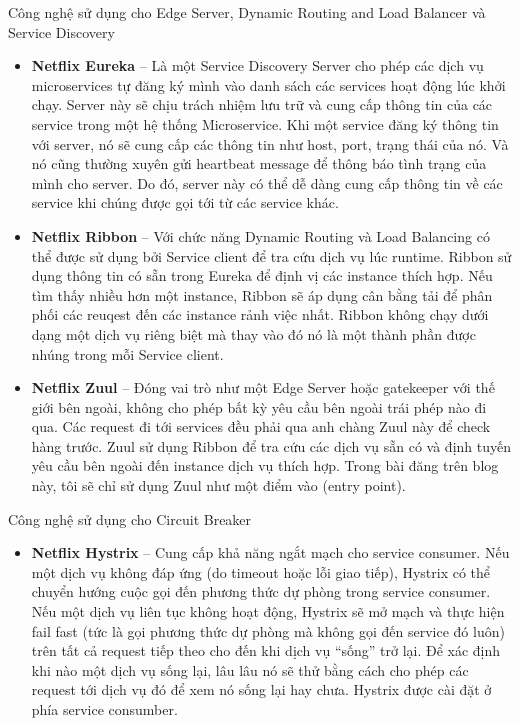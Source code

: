 		Công nghệ sử dụng cho Edge Server, Dynamic Routing and Load Balancer và Service Discovery
		\begin{itemize}
		    \item \textbf{Netflix Eureka} – Là một Service Discovery Server cho phép các dịch vụ microservices tự đăng ký mình vào danh sách các services hoạt động lúc khởi chạy. Server này sẽ chịu trách nhiệm lưu trữ và cung cấp thông tin của các service trong một hệ thống Microservice. Khi một service đăng ký thông tin với server, nó sẽ cung cấp các thông tin như host, port, trạng thái của nó. Và nó cũng thường xuyên gửi heartbeat message để thông báo tình trạng của mình cho server. Do đó, server này có thể dễ dàng cung cấp thông tin về các service khi chúng được gọi tới từ các service khác.
		    \item \textbf{Netflix Ribbon} – Với chức năng Dynamic Routing và Load Balancing có thể được sử dụng bởi Service client để tra cứu dịch vụ lúc runtime. Ribbon sử dụng thông tin có sẵn trong Eureka để định vị các instance thích hợp. Nếu tìm thấy nhiều hơn một instance, Ribbon sẽ áp dụng cân bằng tải để phân phối các reuqest đến các instance rảnh việc nhất. Ribbon không chạy dưới dạng một dịch vụ riêng biệt mà thay vào đó nó là một thành phần được nhúng trong mỗi Service client.
		    \item \textbf{Netflix Zuul} – Đóng vai trò như một Edge Server hoặc gatekeeper với thế giới bên ngoài, không cho phép bất kỳ yêu cầu bên ngoài trái phép nào đi qua. Các request đi tới services đều phải qua anh chàng Zuul này để check hàng trước. Zuul sử dụng Ribbon để tra cứu các dịch vụ sẵn có và định tuyến yêu cầu bên ngoài đến instance dịch vụ thích hợp. Trong bài đăng trên blog này, tôi sẽ chỉ sử dụng Zuul như một điểm vào (entry point).
		\end{itemize}
		Công nghệ sử dụng cho Circuit Breaker
		\begin{itemize}
		    \item \textbf{Netflix Hystrix} – Cung cấp khả năng ngắt mạch cho service consumer. Nếu một dịch vụ không đáp ứng (do timeout hoặc lỗi giao tiếp), Hystrix có thể chuyển hướng cuộc gọi đến phương thức dự phòng trong service consumer. Nếu một dịch vụ liên tục không hoạt động, Hystrix sẽ mở mạch và thực hiện fail fast (tức là gọi phương thức dự phòng mà không gọi đến service đó luôn) trên tất cả request tiếp theo cho đến khi dịch vụ “sống” trở lại. Để xác định khi nào một dịch vụ sống lại, lâu lâu nó sẽ thử bằng cách cho phép các request tới dịch vụ đó để xem nó sống lại hay chưa. Hystrix được cài đặt ở phía service consumber.
		\end{itemize}
